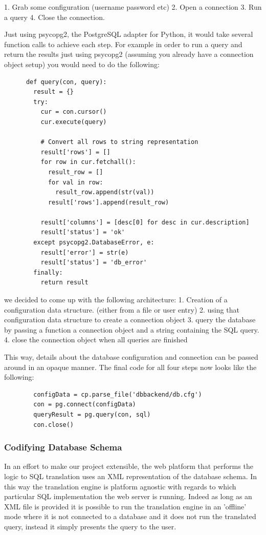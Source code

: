 \documentclass[a4paper, 11pt]{article}
\begin{document}
      1. Grab some configuration (username password etc)
      2. Open a connection
      3. Run a query
      4. Close the connection.

      Just using psycopg2, the PostgreSQL adapter for Python, it would take
      several function calls to achieve each step. For example in order to run a
      query and return the results just using psycopg2 (assuming you already
      have a connection object setup) you would need to do the following:
      
     
      \begin{verbatim}
      def query(con, query):
        result = {}
        try:
          cur = con.cursor()
          cur.execute(query)

          # Convert all rows to string representation
          result['rows'] = []
          for row in cur.fetchall():
            result_row = []
            for val in row:
              result_row.append(str(val))
            result['rows'].append(result_row)

          result['columns'] = [desc[0] for desc in cur.description]
          result['status'] = 'ok'
        except psycopg2.DatabaseError, e:
          result['error'] = str(e)
          result['status'] = 'db_error'
        finally:
          return result
      \end{verbatim}

      we decided to come up with the following architecture: 
      1. Creation of a configuration data structure. (either from a file or user
         entry)
      2. using that configuration data structure to create a connection object
      3. query the database by passing a function a connection object and a
      string containing the SQL query.
      4. close the connection object when all queries are finished

      This way, details about the database configuration and connection 
      can be passed around in an opaque manner. The final code for all four
      steps now looks like the following: 

      \begin{verbatim}
        configData = cp.parse_file('dbbackend/db.cfg')
        con = pg.connect(configData)
        queryResult = pg.query(con, sql)
        con.close()
      \end{verbatim}

      \subsubsection{Codifying Database Schema}
      In an effort to make our project extensible, the web platform that performs 
      the logic to SQL translation uses an XML representation of the database
      schema. In this way the translation engine is platform agnostic with
      regards to which particular SQL implementation the web server is running.
      Indeed as long as an XML file is provided it is possible to run the
      translation engine in an 'offline' mode where it is not connected to a
      database and it does not run the translated query, instead it simply
      presents the query to the user.
\end{document}
